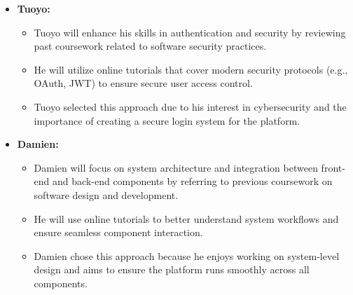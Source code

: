 \begin{enumerate}
\begin{itemize}
        \item \textbf{Tuoyo:}
        \begin{itemize}
            \item Tuoyo will enhance his skills in authentication and security by reviewing past coursework related to software security practices.
            \item He will utilize online tutorials that cover modern security protocols (e.g., OAuth, JWT) to ensure secure user access control.
            \item Tuoyo selected this approach due to his interest in cybersecurity and the importance of creating a secure login system for the platform.
        \end{itemize}

        \item \textbf{Damien:}
        \begin{itemize}
            \item Damien will focus on system architecture and integration between front-end and back-end components by referring to previous coursework on software design and development.
            \item He will use online tutorials to better understand system workflows and ensure seamless component interaction.
            \item Damien chose this approach because he enjoys working on system-level design and aims to ensure the platform runs smoothly across all components.
        \end{itemize}
    \end{itemize}
\end{enumerate}